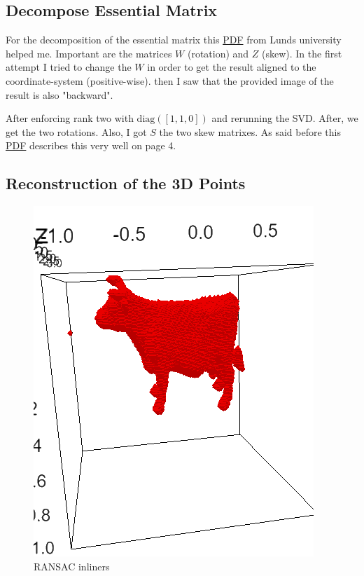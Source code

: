 \documentclass[12pt]{article}
\begin{document}
\subsection{Decompose Essential Matrix}

For the decomposition of the essential matrix this 
\href{http://www.maths.lth.se/matematiklth/personal/calle/datorseende13/notes/forelas6.pdf}{PDF} from 
Lunds university helped me. Important are the matrices $W$ (rotation) and $Z$ (skew). In the first attempt
I tried to change the $W$ in order to get the result aligned to the coordinate-system (positive-wise). then
I saw that the provided image of the result is also "backward".

After enforcing rank two with $\mathrm{diag}([1,1,0])$ and rerunning the SVD. After, we get the two
rotations. Also, I got $S$ the two skew matrixes. As said before this 
\href{http://www.maths.lth.se/matematiklth/personal/calle/datorseende13/notes/forelas6.pdf}{PDF}
describes this very well on page 4.

\subsection{Reconstruction of the 3D Points}
\begin{figure}[h!]
    \centering
    \includegraphics[scale=0.5]{3d_res.png}
    \caption{RANSAC inliners}
\end{figure}
\end{document}
